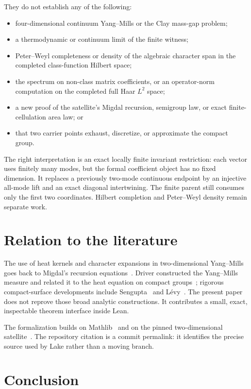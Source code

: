 \documentclass[11pt]{article}
\theoremstyle{definition}
\theoremstyle{remark}
\begin{document}
They do not establish any of the following:
\begin{itemize}
\item four-dimensional continuum Yang--Mills or the Clay mass-gap problem;
\item a thermodynamic or continuum limit of the finite witness;
\item Peter--Weyl completeness or density of the algebraic character span in
the completed class-function Hilbert space;
\item the spectrum on non-class matrix coefficients, or an operator-norm
computation on the completed full Haar $L^2$ space;
\item a new proof of the satellite's Migdal recursion, semigroup law, or exact
finite-cellulation area law; or
\item that two carrier points exhaust, discretize, or approximate the compact
group.
\end{itemize}

The right interpretation is an exact locally finite invariant restriction:
each vector uses finitely many modes, but the formal coefficient object has no
fixed dimension.  It replaces a previously two-mode continuous endpoint by an
injective all-mode lift and an exact diagonal intertwining.  The finite parent
still consumes only the first two coordinates.  Hilbert completion and
Peter--Weyl density remain separate work.

\section{Relation to the literature}

The use of heat kernels and character expansions in two-dimensional
Yang--Mills goes back to Migdal's recursion equations~\cite{Migdal1975}.
Driver constructed the Yang--Mills measure and related it to the heat equation
on compact groups~\cite{Driver1989}; rigorous compact-surface developments
include Sengupta~\cite{Sengupta1997} and L\'evy~\cite{Levy2003}.  The present
paper does not reprove those broad analytic constructions.  It contributes a
small, exact, inspectable theorem interface inside Lean.

The formalization builds on Mathlib~\cite{Mathlib2020} and on the pinned
two-dimensional satellite~\cite{Lean2dYM}.  The repository citation is a
commit permalink: it identifies the precise source used by Lake rather than a
moving branch.

\section{Conclusion}
\end{document}

